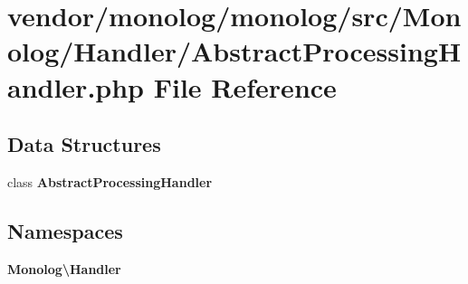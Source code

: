\section{vendor/monolog/monolog/src/\+Monolog/\+Handler/\+Abstract\+Processing\+Handler.php File Reference}
\label{_abstract_processing_handler_8php}
\subsection*{Data Structures}
\begin{DoxyCompactItemize}
\item 
class {\bf Abstract\+Processing\+Handler}
\end{DoxyCompactItemize}
\subsection*{Namespaces}
\begin{DoxyCompactItemize}
\item 
 {\bf Monolog\textbackslash{}\+Handler}
\end{DoxyCompactItemize}
